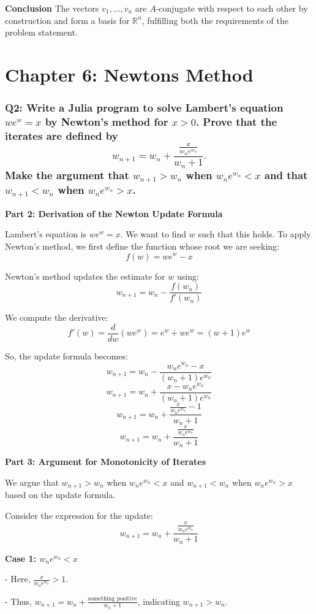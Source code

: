 \documentclass{article}
\begin{document}
\textbf{Conclusion}
The vectors \(v_1, \ldots, v_n\) are \(A\)-conjugate with respect to each other by construction and form a basis for \(\mathbb{R}^n\), fulfilling both the requirements of the problem statement.

\newpage
\section*{Chapter 6: Newtons Method}
\subsubsection*{Q2: Write a Julia program to solve Lambert’s equation \(we^w = x\) by Newton’s method for \(x > 0\). Prove that the iterates are defined by
\[ w_{n+1} = w_n + \frac{\frac{x}{w_n e^{w_n}}}{w_n + 1}. \]
Make the argument that \(w_{n+1} > w_n\) when \(w_n e^{w_n} < x\) and that \(w_{n+1} < w_n\) when \(w_n e^{w_n} > x\).}


\textbf{Part 2: Derivation of the Newton Update Formula}

Lambert's equation is \(we^w = x\). We want to find \(w\) such that this holds. To apply Newton's method, we first define the function whose root we are seeking:
\[ f(w) = we^w - x \]

Newton's method updates the estimate for \(w\) using:
\[ w_{n+1} = w_n - \frac{f(w_n)}{f'(w_n)} \]

We compute the derivative:
\[ f'(w) = \frac{d}{dw}(we^w) = e^w + we^w = (w + 1)e^w \]

So, the update formula becomes:
\[ w_{n+1} = w_n - \frac{w_n e^{w_n} - x}{(w_n + 1)e^{w_n}} \]
\[ w_{n+1} = w_n + \frac{x - w_n e^{w_n}}{(w_n + 1)e^{w_n}} \]
\[ w_{n+1} = w_n + \frac{\frac{x}{w_n e^{w_n}} - 1}{w_n + 1} \]
\[ w_{n+1} = w_n + \frac{\frac{x}{w_n e^{w_n}}}{w_n + 1} \]

\textbf{Part 3: Argument for Monotonicity of Iterates}

We argue that \(w_{n+1} > w_n\) when \(w_n e^{w_n} < x\) and \(w_{n+1} < w_n\) when \(w_n e^{w_n} > x\) based on the update formula.

Consider the expression for the update:
\[ w_{n+1} = w_n + \frac{\frac{x}{w_n e^{w_n}}}{w_n + 1} \]

\textbf{Case 1: \(w_n e^{w_n} < x\)}

- Here, \(\frac{x}{w_n e^{w_n}} > 1\).

- Thus, \(w_{n+1} = w_n + \frac{\text{something positive}}{w_n + 1}\), indicating \(w_{n+1} > w_n\).
\end{document}
